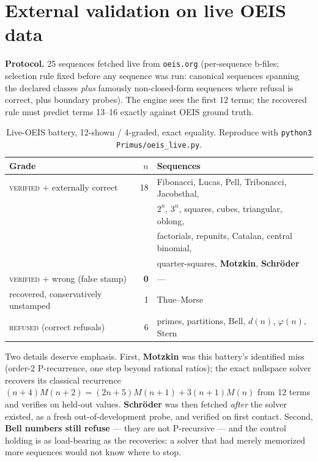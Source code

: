 \documentclass[11pt]{article}
\newcommand{\Verified}{\textsc{verified}}
\newcommand{\Refused}{\textsc{refused}}
\begin{document}
\section{External validation on live OEIS data}\label{sec:external}
\textbf{Protocol.} 25 sequences fetched live from \texttt{oeis.org}
(per-sequence b-files; selection rule fixed before any sequence was run:
canonical sequences spanning the declared classes \emph{plus} famously
non-closed-form sequences where refusal is correct, plus boundary probes).
The engine sees the first 12 terms; the recovered rule must predict terms
13--16 exactly against OEIS ground truth.

\begin{table}[h]\centering
\begin{tabular}{lrl}
\toprule
Grade & $n$ & Sequences \\
\midrule
\Verified{} + externally correct & 18 & Fibonacci, Lucas, Pell, Tribonacci, Jacobsthal,\\
 & & $2^n$, $3^n$, squares, cubes, triangular, oblong,\\
 & & factorials, repunits, Catalan, central binomial,\\
 & & quarter-squares, \textbf{Motzkin}, \textbf{Schr\"oder} \\
\Verified{} + wrong (false stamp) & \textbf{0} & --- \\
recovered, conservatively unstamped & 1 & Thue--Morse \\
\Refused{} (correct refusals) & 6 & primes, partitions, Bell, $d(n)$, $\varphi(n)$, Stern \\
\bottomrule
\end{tabular}
\caption{Live-OEIS battery, 12-shown / 4-graded, exact equality. Reproduce
with \texttt{python3 Primus/oeis\_live.py}.}
\end{table}

Two details deserve emphasis. First, \textbf{Motzkin} was this battery's
identified miss (order-2 P-recurrence, one step beyond rational ratios); the
exact nullspace solver recovers its classical recurrence
$(n{+}4)M(n{+}2)=(2n{+}5)M(n{+}1)+3(n{+}1)M(n)$ from 12 terms and verifies
on held-out values. \textbf{Schr\"oder} was then fetched \emph{after} the
solver existed, as a fresh out-of-development probe, and verified on first
contact. Second, \textbf{Bell numbers still refuse} --- they are not
P-recursive --- and the control holding is as load-bearing as the
recoveries: a solver that had merely memorized more sequences would not
know where to stop.
\end{document}
